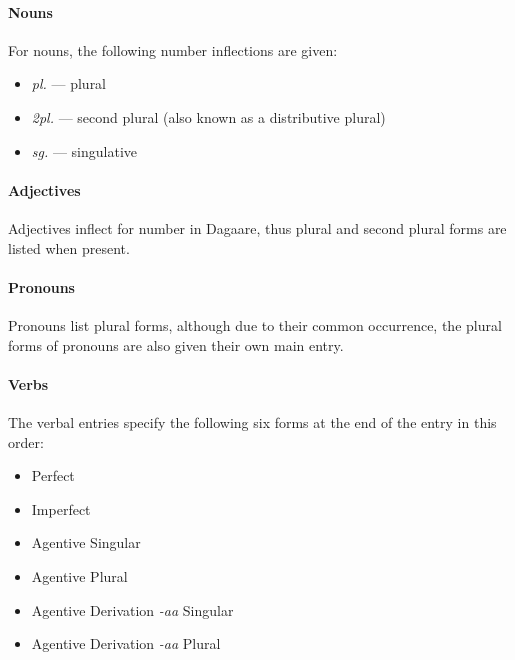 \begin{refsection}







\paragraph*{Nouns} For nouns, the following number inflections are given:

\begin{itemize}\setlength\itemsep{0em}
 \item \textit{ pl.} — plural
\item \textit{ 2pl.} — second plural (also known as a distributive plural) 
\item \textit{ sg.} — singulative
\end{itemize}

\paragraph*{Adjectives}

Adjectives inflect for number in Dagaare, thus  plural and second plural forms are listed when present.  

\paragraph*{Pronouns}

Pronouns list plural forms, although due to their common occurrence, the plural forms of pronouns are also given their own main entry. 

\paragraph*{Verbs}

The verbal entries specify the following six forms at the end of the entry  in this order:  

\begin{itemize}\setlength\itemsep{0em}
\item Perfect \item Imperfect \item Agentive Singular \item Agentive Plural \item Agentive Derivation \textit{ -aa} Singular \item Agentive Derivation \textit{ -aa} Plural
\end{itemize}



\end{refsection}
